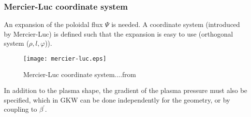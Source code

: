 \subsubsection{Mercier-Luc coordinate system}
An expansion of the poloidal flux $\Psi$ is needed. A coordinate system (introduced by Mercier-Luc) is defined such that the expansion is easy to use (orthogonal system ($\rho,l,\varphi$)).
\begin{figure}[h]
\begin{center}
\texttt{[image: mercier-luc.eps]}
\caption{Mercier-Luc coordinate system.\label{merc-luc}...from \cite{CAN09}}
\end{center}
\end{figure}
In addition to the plasma shape, 
the gradient of the plasma pressure must also be specified, which in GKW can be done independently for the geometry, or by coupling to $\beta^\prime$.

